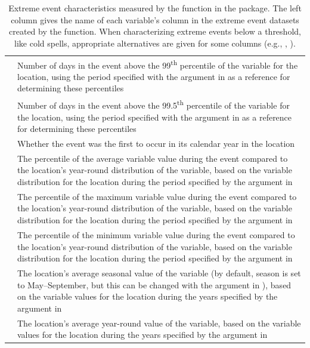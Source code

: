 \begin{table}
\begin{tabular}{lL{\tabcolsep\relax}}
 & Number of days in the event above the 99\textsuperscript{th} percentile of the variable for the location, using the period specified with the  argument in  as a reference for determining these percentiles \\
 & Number of days in the event above the 99.5\textsuperscript{th} percentile of the variable for the location, using the period specified with the  argument in  as a reference for determining these percentiles \\
 & Whether the event was the first to occur in its calendar year in the location \\
 & The percentile of the average variable value during the event compared to the location's year-round distribution of the variable, based on the variable distribution for the location during the period specified by the  argument in  \\
 & The percentile of the maximum variable value during the event compared to the location's year-round distribution of the variable, based on the variable distribution for the location during the period specified by the  argument in  \\
 & The percentile of the minimum variable value during the event compared to the location's year-round distribution of the variable, based on the variable distribution for the location during the period specified by the  argument in  \\
 & The location's average seasonal value of the variable (by default, season is set to May--September, but this can be changed with the  argument in ), based on the variable values for the location during the years specified by the  argument in  \\
 & The location's average year-round value of the variable, based on the variable values for the location during the years specified by the  argument in  \\
\bottomrule
\end{tabular}
\caption{Extreme event characteristics measured by the  function in the  package. The left column gives the name of each variable's column in the extreme event datasets created by the  function. When characterizing extreme events below a threshold, like cold spells, appropriate alternatives are given for some columns (e.g., , ).}
\label{tab:hwcharacteristics}
\end{table}

